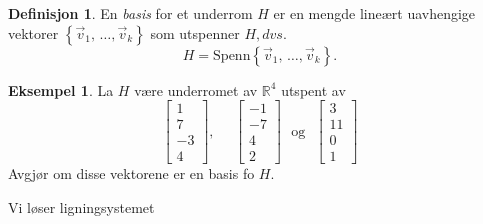 \documentclass[11pt]{article}
\theoremstyle{definition}
\newtheorem{mindef}{Definisjon}[section]
\newenvironment{fmindef}
{\begin{mdframed}[style=minstil]\begin{mindef}}
		{\end{mindef}\end{mdframed}}
\theoremstyle{definition}
\newtheorem{mitteks}{Eksempel}[section]
\theoremstyle{definition}
\theoremstyle{definition}
\theoremstyle{definition}
\theoremstyle{definition}
\begin{document}
		\begin{fmindef}
		En \textit{basis} for et underrom \(H\) er en mengde lineært uavhengige vektorer \(\left\lbrace \vec{v}_1,\,\ldots,\vec{v}_k \right\rbrace \) som utspenner \(H, dvs.\) \[H=\text{Spenn}\left\lbrace \vec{v}_1,\,\ldots,\vec{v}_k \right\rbrace. \]
		\end{fmindef}
		
		\begin{mitteks}
		La \(H\) være underromet av \(\mathbb{R}^4 \) utspent av 
		\[\left[\begin{array}{rr} 
		1 \\
		7 \\
		-3 \\
		4
		\end{array} \right],\hspace{16pt}
		\left[\begin{array}{rr} 
		-1 \\
		-7 \\
		4 \\
		2
		\end{array} \right]
		\hspace{8pt}\text{og}\hspace{8pt}
		\left[\begin{array}{rr} 
		3 \\
		11 \\
		0 \\
		1
		\end{array} \right]
		\]
		Avgjør om disse vektorene er en basis fo \(H\).
		
		Vi løser ligningsystemet
		

\end{mitteks}
\end{document}

